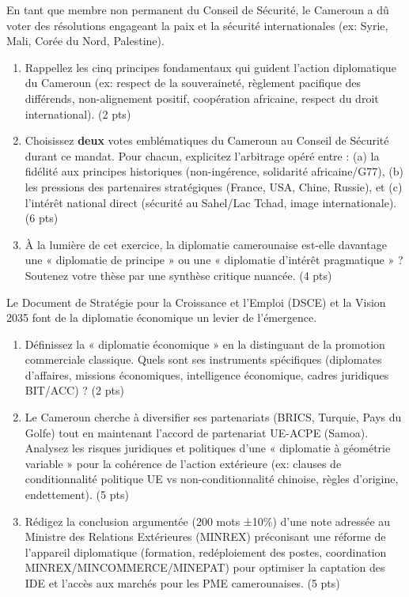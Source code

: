 \documentclass[11pt]{article}
\begin{document}
\begin{exercice}
En tant que membre non permanent du Conseil de Sécurité, le Cameroun a dû voter des résolutions engageant la paix et la sécurité internationales (ex: Syrie, Mali, Corée du Nord, Palestine).
\begin{enumerate}
    \item Rappellez les cinq principes fondamentaux qui guident l'action diplomatique du Cameroun (ex: respect de la souveraineté, règlement pacifique des différends, non-alignement positif, coopération africaine, respect du droit international). (2 pts)
    \item Choisissez \textbf{deux} votes emblématiques du Cameroun au Conseil de Sécurité durant ce mandat. Pour chacun, explicitez l'arbitrage opéré entre : (a) la fidélité aux principes historiques (non-ingérence, solidarité africaine/G77), (b) les pressions des partenaires stratégiques (France, USA, Chine, Russie), et (c) l'intérêt national direct (sécurité au Sahel/Lac Tchad, image internationale). (6 pts)
    \item À la lumière de cet exercice, la diplomatie camerounaise est-elle davantage une « diplomatie de principe » ou une « diplomatie d'intérêt pragmatique » ? Soutenez votre thèse par une synthèse critique nuancée. (4 pts)
\end{enumerate}
\end{exercice}

\begin{exercice}
Le Document de Stratégie pour la Croissance et l'Emploi (DSCE) et la Vision 2035 font de la diplomatie économique un levier de l'émergence.
\begin{enumerate}
    \item Définissez la « diplomatie économique » en la distinguant de la promotion commerciale classique. Quels sont ses instruments spécifiques (diplomates d'affaires, missions économiques, intelligence économique, cadres juridiques BIT/ACC) ? (2 pts)
    \item Le Cameroun cherche à diversifier ses partenariats (BRICS, Turquie, Pays du Golfe) tout en maintenant l'accord de partenariat UE-ACPE (Samoa). Analysez les risques juridiques et politiques d'une « diplomatie à géométrie variable » pour la cohérence de l'action extérieure (ex: clauses de conditionnalité politique UE vs non-conditionnalité chinoise, règles d'origine, endettement). (5 pts)
    \item Rédigez la conclusion argumentée (200 mots ±10\%) d'une note adressée au Ministre des Relations Extérieures (MINREX) préconisant une réforme de l'appareil diplomatique (formation, redéploiement des postes, coordination MINREX/MINCOMMERCE/MINEPAT) pour optimiser la captation des IDE et l'accès aux marchés pour les PME camerounaises. (5 pts)
\end{enumerate}
\end{exercice}
\end{document}
